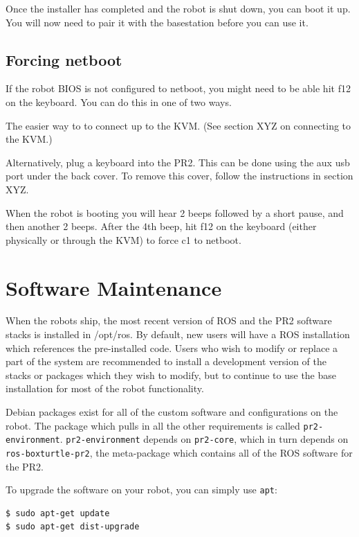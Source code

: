 Once the installer has completed and the robot is shut down, you can
boot it up.  You will now need to pair it with the basestation before
you can use it.

\subsection{Forcing netboot}

If the robot BIOS is not configured to netboot, you might need to be
able hit f12 on the keyboard.  You can do this in one of two ways.

The easier way to to connect up to the KVM.  (See section XYZ on connecting to the KVM.)

Alternatively, plug a keyboard into the PR2.  This can be done using
the aux usb port under the back cover.  To remove this cover, follow
the instructions in section XYZ.

When the robot is booting you will hear 2 beeps followed by a short
pause, and then another 2 beeps.  After the 4th beep, hit f12 on the
keyboard (either physically or through the KVM) to force c1 to netboot.


\section{Software Maintenance}

When the robots ship, the most recent version of ROS and the PR2
software stacks is installed in /opt/ros.  By default, new users will
have a ROS installation which references the pre-installed code.
Users who wish to modify or replace a part of the system are
recommended to install a development version of the stacks or packages
which they wish to modify, but to continue to use the base
installation for most of the robot functionality.

Debian packages exist for all of the custom software and
configurations on the robot.  The package which pulls in all the other
requirements is called \texttt{pr2-environment}.
\texttt{pr2-environment} depends on \texttt{pr2-core}, which in turn
depends on \texttt{ros-boxturtle-pr2}, the meta-package which contains
all of the ROS software for the PR2.

To upgrade the software on your robot, you can simply use \texttt{apt}:

\begin{verbatim}
$ sudo apt-get update
$ sudo apt-get dist-upgrade
\end{verbatim}

